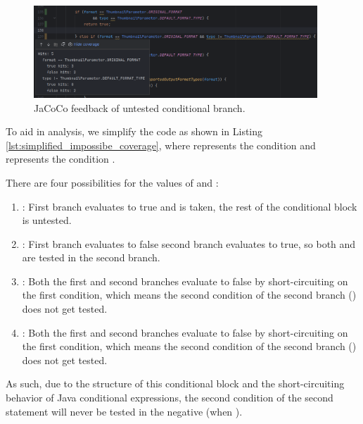 \documentclass[12pt]{article}
\begin{document}
    

    \begin{figure}[H]
        \centering
        \includegraphics[width=0.95\textwidth]{images/jacoco_impossible_coverage.png}
        \caption[JaCoCo feedback of untested conditional branch.]{JaCoCo feedback of untested conditional branch.}
        \label{fig:jacoco_impossible_coverage}
    \end{figure}

    To aid in analysis, we simplify the code as shown in Listing
        \ref{lst:simplified_impossibe_coverage}, where  represents the
        condition  and
         represents the condition
        .

    

    There are four possibilities for the values of  and :
    \begin{enumerate}
        \item
            :
                First branch evaluates to true and is taken, the rest of the
                    conditional block is untested.
        \item
            :
                First branch evaluates to false second branch evaluates to true,
                    so both  and  are tested in the second
                    branch.
        \item
            :
                Both the first and second branches evaluate to false by
                    short-circuiting on the first condition, which means the
                    second condition of the second branch () does not
                    get tested.
        \item
            :
                Both the first and second branches evaluate to false by
                    short-circuiting on the first condition, which means the
                    second condition of the second branch () does not
                    get tested.
    \end{enumerate}
    As such, due to the structure of this conditional block and the
        short-circuiting behavior of Java conditional expressions, the second
        condition of the second statement will never be tested in the negative
        (when ).
\end{document}
